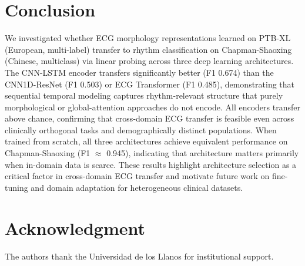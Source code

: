 \documentclass[journal]{IEEEtran}
\begin{document}
\section{Conclusion}

We investigated whether ECG morphology representations learned on
PTB-XL (European, multi-label) transfer to rhythm classification on
Chapman-Shaoxing (Chinese, multiclass) via linear probing across three
deep learning architectures. The CNN-LSTM encoder transfers
significantly better (F1 0.674) than the CNN1D-ResNet (F1 0.503) or
ECG Transformer (F1 0.485), demonstrating that sequential temporal
modeling captures rhythm-relevant structure that purely morphological
or global-attention approaches do not encode. All encoders transfer
above chance, confirming that cross-domain ECG transfer is feasible
even across clinically orthogonal tasks and demographically distinct
populations. When trained from scratch, all three architectures achieve
equivalent performance on Chapman-Shaoxing (F1 $\approx$ 0.945),
indicating that architecture matters primarily when in-domain data is
scarce. These results highlight architecture selection as a critical
factor in cross-domain ECG transfer and motivate future work on
fine-tuning and domain adaptation for heterogeneous clinical datasets.

\section*{Acknowledgment}
The authors thank the Universidad de los Llanos for institutional support.
\end{document}
